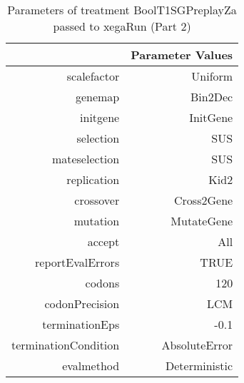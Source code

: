 \begin{table}[ht]
\centering
\begin{tabular}{rr}
  \hline
 & Parameter Values \\ 
  \hline
scalefactor & Uniform \\ 
  genemap & Bin2Dec \\ 
  initgene & InitGene \\ 
  selection & SUS \\ 
  mateselection & SUS \\ 
  replication & Kid2 \\ 
  crossover & Cross2Gene \\ 
  mutation & MutateGene \\ 
  accept & All \\ 
  reportEvalErrors & TRUE \\ 
  codons & 120 \\ 
  codonPrecision & LCM \\ 
  terminationEps & -0.1 \\ 
  terminationCondition & AbsoluteError \\ 
  evalmethod & Deterministic \\ 
   \hline
\end{tabular}
\caption{ Parameters of treatment BoolT1SGPreplayZa passed to xegaRun
 (Part 2)} 
\end{table}

